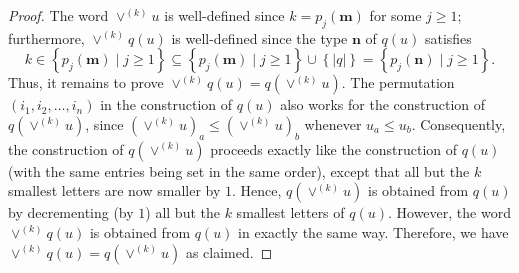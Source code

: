 \documentclass[reqno]{amsart}%
\newcommand{\0}{\phantom{c}}
\theoremstyle{plain}
\theoremstyle{definition}
\numberwithin{equation}{section}
\begin{document}
\begin{proof}
The word $\vee^{(k)} u$ is well-defined since $k = p_{j}(\mathbf{m})$ for some
$j \geq1$; furthermore, $\vee^{(k)} q(u)$ is well-defined since the type
$\mathbf{n}$ of $q(u)$ satisfies
\[
k \in\left\{  p_{j}(\mathbf{m}) \mid j \geq1 \right\}  \subseteq\left\{
p_{j}(\mathbf{m}) \mid j \geq1 \right\}  \cup\left\{  \left|  q \right|
\right\}  = \left\{  p_{j}(\mathbf{n}) \mid j \geq1 \right\}  .
\]
Thus, it remains to prove $\vee^{(k)} q(u) = q(\vee^{(k)} u)$. The permutation
$\left(  i_{1}, i_{2}, \dotsc, i_{n} \right)  $ in the construction of $q(u)$
also works for the construction of $q(\vee^{(k)} u)$, since $(\vee^{(k)}
u)_{a} \leq(\vee^{(k)} u)_{b}$ whenever $u_{a} \leq u_{b}$. Consequently, the
construction of $q(\vee^{(k)} u)$ proceeds exactly like the construction of
$q(u)$ (with the same entries being set in the same order), except that all
but the $k$ smallest letters are now smaller by $1$. Hence, $q(\vee^{(k)} u)$
is obtained from $q(u)$ by decrementing (by $1$) all but the $k$ smallest
letters of $q(u)$.
However, the word $\vee^{(k)} q(u)$ is obtained from $q(u)$ in exactly the
same way. Therefore, we have $\vee^{(k)} q(u) = q(\vee^{(k)} u)$ as claimed.
\end{proof}
\end{document}
